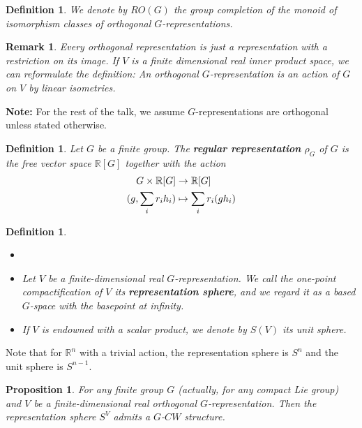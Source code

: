 \documentclass{scrartcl}
\newcommand{\textbi}[1]{\textbf{\textit{#1}}}
\newcommand{\bR}{\mathbb{R}}
\newtheorem{defin}[subsection]{Definition}
\newtheorem{prop}[subsection]{Proposition}
\newtheorem{rem}[subsection]{Remark}
\begin{document}
\begin{defin}
    We denote by $RO(G)$ the group completion of the monoid of isomorphism classes of orthogonal $G$-representations.
\end{defin}

\begin{rem}
    Every orthogonal representation is just a representation with a restriction on its image. If $V$ is a finite dimensional real inner product space, we can reformulate the definition: An orthogonal $G$-representation is an action of $G$ on $V$ by linear isometries.
\end{rem}

\textbf{Note:} For the rest of the talk, we assume $G$-representations are orthogonal unless stated otherwise.

\begin{defin}
    Let $G$ be a finite group. The \textbi{regular representation} $\rho_G$ of $G$ is the free vector space $\bR[G]$ together with the action
    \begin{align*}
        G\times \bR[G]&\to \bR[G] \\
        (g,\small \sum_ir_ih_i)&\mapsto \small \sum_ir_i(gh_i)
    \end{align*}
\end{defin}

\begin{defin}
\begin{itemize}
    \item[] 
    \item Let $V$ be a finite-dimensional real $G$-representation. We call the one-point compactification of $V$ its \textbi{representation sphere}, and we regard it as a based $G$-space with the basepoint at infinity.
    \item If $V$ is endowned with a scalar product, we denote by $S(V)$ its unit sphere.
\end{itemize}    
\end{defin} 

Note that for $\bR^n$ with a trivial action, the representation sphere is $S^n$ and the unit sphere is $S^{n-1}$.

\begin{prop}
    For any finite group $G$ (actually, for any compact Lie group) and $V$ be a finite-dimensional real orthogonal $G$-representation. Then the representation sphere $S^V$ admits a $G$-$CW$ structure.
\end{prop} 

\end{document}
